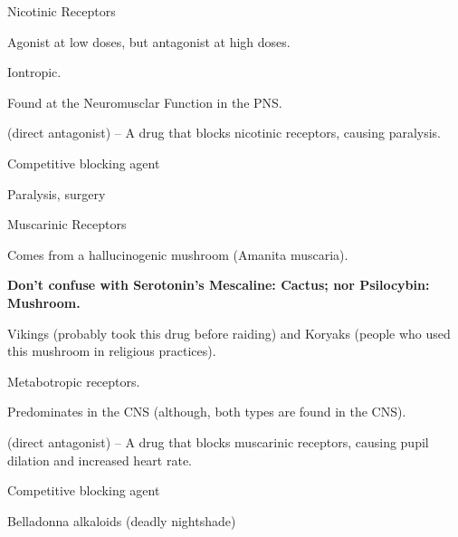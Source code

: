 \begin{coloredlist}
    \item Nicotinic Receptors
    \begin{coloredlist}
        \item Agonist at low doses, but antagonist at high doses.
        \item Iontropic.
        \item Found at the Neuromusclar Function in the PNS.
        \item {} (direct antagonist) -- A drug that blocks nicotinic receptors, causing paralysis.
        \begin{coloredlist}
            \item Competitive blocking agent
            \item Paralysis, surgery
        \end{coloredlist}
    \end{coloredlist}
    \item Muscarinic Receptors
    \begin{coloredlist}
        \item Comes from a hallucinogenic mushroom (Amanita muscaria).
        \begin{coloredlist}
            \item \textbf{Don't confuse with Serotonin's Mescaline: Cactus; nor Psilocybin: Mushroom.}
        \end{coloredlist}
        \item Vikings (probably took this drug before raiding) and Koryaks (people who used this mushroom in religious practices).
        \item Metabotropic receptors.
        \item Predominates in the CNS (although, both types are found in the CNS).
        \item {} (direct antagonist) -- A drug that blocks muscarinic receptors, causing pupil dilation and increased heart rate.
        \begin{coloredlist}
            \item Competitive blocking agent
            \item Belladonna alkaloids (deadly nightshade)
        \end{coloredlist}
    \end{coloredlist}
\end{coloredlist}